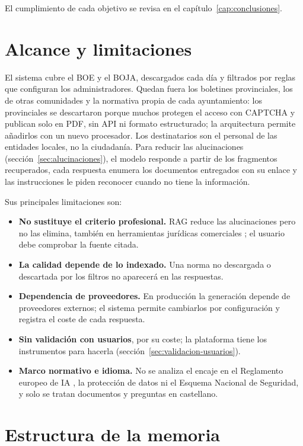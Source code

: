 El cumplimiento de cada objetivo se revisa en el capítulo~\ref{cap:conclusiones}.

\section{Alcance y limitaciones}
\label{sec:alcance}

El sistema cubre el BOE y el BOJA, descargados cada día y filtrados por reglas que configuran los administradores. Quedan fuera los boletines provinciales, los de otras comunidades y la normativa propia de cada ayuntamiento: los provinciales se descartaron porque muchos protegen el acceso con CAPTCHA y publican solo en PDF, sin API ni formato estructurado; la arquitectura permite añadirlos con un nuevo procesador. Los destinatarios son el personal de las entidades locales, no la ciudadanía. Para reducir las alucinaciones (sección~\ref{sec:alucinaciones}), el modelo responde a partir de los fragmentos recuperados, cada respuesta enumera los documentos entregados con su enlace y las instrucciones le piden reconocer cuando no tiene la información.

Sus principales limitaciones son:
\begin{itemize}
  \item \textbf{No sustituye el criterio profesional.} RAG reduce las alucinaciones pero no las elimina, también en herramientas jurídicas comerciales \cite{magesh2025}; el usuario debe comprobar la fuente citada.
  \item \textbf{La calidad depende de lo indexado.} Una norma no descargada o descartada por los filtros no aparecerá en las respuestas.
  \item \textbf{Dependencia de proveedores.} En producción la generación depende de proveedores externos; el sistema permite cambiarlos por configuración y registra el coste de cada respuesta.
  \item \textbf{Sin validación con usuarios}, por su coste; la plataforma tiene los instrumentos para hacerla (sección~\ref{sec:validacion-usuarios}).
  \item \textbf{Marco normativo e idioma.} No se analiza el encaje en el Reglamento europeo de IA \cite{aiact}, la protección de datos ni el Esquema Nacional de Seguridad, y solo se tratan documentos y preguntas en castellano.
\end{itemize}

\section{Estructura de la memoria}
\label{sec:estructura}

